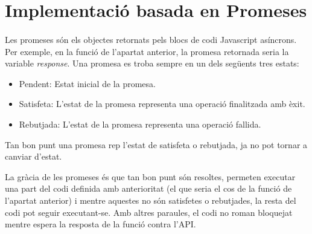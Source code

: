\section{Implementació basada en Promeses}

    \paragraph{}
    Les promeses són els objectes retornats pels blocs de codi Javascript asíncrons. Per exemple, en la funció de l’apartat anterior, la promesa retornada seria la variable \emph{response}. Una promesa es troba sempre en un dels següents tres estats:

    \begin{itemize}
        \item Pendent: Estat inicial de la promesa.
        \item Satisfeta: L'estat de la promesa representa una operació finalitzada amb èxit.
        \item Rebutjada: L'estat de la promesa representa una operació fallida.
    \end{itemize}

    Tan bon punt una promesa rep l'estat de satisfeta o rebutjada, ja no pot tornar a canviar d'estat.

    La gràcia de les promeses és que tan bon punt són resoltes, permeten executar una part del codi definida amb anterioritat (el que seria el cos de la funció de l'apartat anterior) i mentre aquestes no són satisfetes o rebutjades, la resta del codi pot seguir executant-se. Amb altres paraules, el codi no roman bloquejat mentre espera la resposta de la funció contra l’API.
